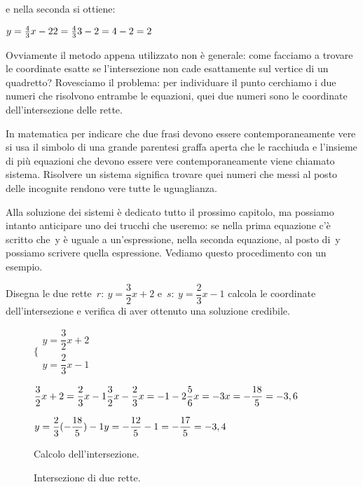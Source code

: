    e nella seconda si ottiene:
   
   $y = \frac{4}{3} x -2 \newline
    2 = \frac{4}{3} 3 -2 = 4 -2 = 2$
   
Ovviamente il metodo appena utilizzato non è generale: come facciamo a trovare 
le coordinate esatte se l'intersezione non cade esattamente sul vertice di  
un quadretto? Rovesciamo il problema: per individuare il punto 
cerchiamo i due numeri che risolvono entrambe le equazioni, quei due numeri
sono le coordinate dell'intersezione delle rette.

In matematica per indicare che due frasi devono essere contemporaneamente 
vere si usa il simbolo di una grande parentesi graffa aperta che le racchiuda 
e l'insieme di più equazioni che devono essere vere contemporaneamente viene
chiamato sistema. Risolvere un sistema significa trovare quei numeri che 
messi al posto delle incognite rendono vere tutte le uguaglianza.

Alla soluzione dei sistemi è dedicato tutto il prossimo capitolo, ma possiamo 
intanto anticipare uno dei trucchi che useremo: se nella prima equazione c'è 
scritto che~y è uguale a un'espressione, nella seconda equazione, al posto 
di~y possiamo scrivere quella espressione. Vediamo questo procedimento con un 
esempio.

\begin{exrig}
 \begin{esempio}
  Disegna le due rette~$r:~y = \dfrac{3}{2} x +2$ e~$s:~y = \dfrac{2}{3} x -1$ 
  calcola le coordinate dell'intersezione e verifica di aver
  ottenuto una soluzione credibile.
\begin{inaccessibleblock}
 \begin{figure}[h]
 \centering
 \begin{minipage}[]{.60\textwidth}
   $\bigg \{
     \begin{array}{l}
      y = \dfrac{3}{2} x +2 \\
      y = \dfrac{2}{3} x -1
     \end{array}
   $
  
   $\dfrac{3}{2} x +2 = \dfrac{2}{3} x -1 \newline
    \dfrac{3}{2} x - \dfrac{2}{3} x = -1 -2 \newline
    \dfrac{5}{6} x = -3 \newline
    x = -\dfrac{18}{5} = -3,6$
   
   $y = \dfrac{2}{3} (-\dfrac{18}{5}) -1 \newline
    y = - \dfrac{12}{5} -1 = - \dfrac{17}{5} = -3,4$
  \caption{Calcolo dell'intersezione.}\label{fig:elementi}
 \end{minipage}
 \begin{minipage}[]{.30\textwidth}
   \centering
  \caption{Intersezione di due rette.}\label{fig:intersezione02}
 \end{minipage}
\end{figure}
\end{inaccessibleblock}
 \end{esempio}
\end{exrig}

